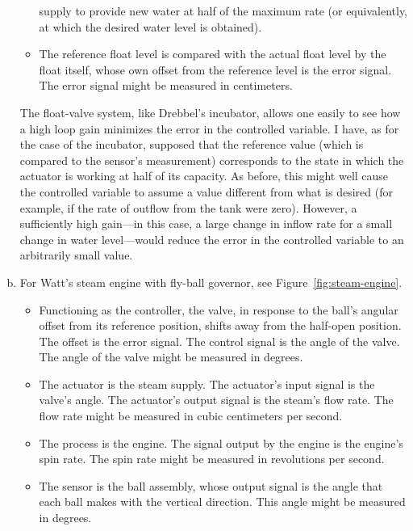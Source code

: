 \begin{enumerate}[(a)]
\begin{itemize}
            supply to provide new water at half of the maximum rate (or
            equivalently, at which the desired water level is obtained).
         \item The reference float level is compared with the actual float
            level by the float itself, whose own offset from the reference
            level is the error signal. The error signal might be measured in
            centimeters.
      \end{itemize}
      The float-valve system, like Drebbel's incubator, allows one easily to
      see how a high loop gain minimizes the error in the controlled variable.
      I have, as for the case of the incubator, supposed that the reference
      value (which is compared to the sensor's measurement) corresponds to the
      state in which the actuator is working at half of its capacity. As
      before, this might well cause the controlled variable to assume a value
      different from what is desired (for example, if the rate of outflow from
      the tank were zero). However, a sufficiently high gain---in this case, a
      large change in inflow rate for a small change in water level---would
      reduce the error in the controlled variable to an arbitrarily small
      value.
   \item For Watt's steam engine with fly-ball governor, see
      Figure~\ref{fig:steam-engine}.
      \begin{itemize}
         \item Functioning as the controller, the valve, in response to the
            ball's angular offset from its reference position, shifts away from
            the half-open position. The offset is the error signal. The control
            signal is the angle of the valve. The angle of the valve might be
            measured in degrees.
         \item The actuator is the steam supply. The actuator's input signal is
            the valve's angle. The actuator's output signal is the steam's flow
            rate. The flow rate might be measured in cubic centimeters per
            second.
         \item The process is the engine. The signal output by the engine is
            the engine's spin rate. The spin rate might be measured in
            revolutions per second.
         \item The sensor is the ball assembly, whose output signal is the
            angle that each ball makes with the vertical direction. This angle
            might be measured in degrees.

\end{itemize}
\end{enumerate}
